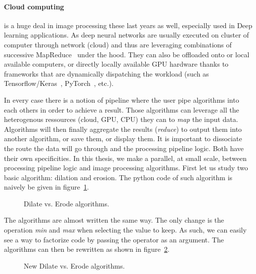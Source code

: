 \paragraph{Cloud computing} is a huge deal in image processing these last years as well, especially used in Deep
learning applications. As deep neural networks are usually executed on cluster of computer through network (cloud) and
thus are leveraging combinations of successive MapReduce~\parencite{dean.2008.mapreduce} under the hood. They can also
be offloaded onto or local available computers, or directly locally available GPU hardware thanks to frameworks that are
dynamically dispatching the workload (such as
Tensorflow/Keras~\parencite{tensorflow.2015.whitepaper,chollet.2015.keras,gulli.2017.deep},
PyTorch~\parencite{paszke.2019.pytorch}, etc.).

In every case there is a notion of pipeline where the user pipe algorithms into each others in order to achieve a
result. Those algorithms can leverage all the heterogenous ressources (cloud, GPU, CPU) they can to \emph{map} the input
data. Algorithms will then finally aggregate the results (\emph{reduce}) to output them into another algorithm, or save
them, or display them. It is important to dissociate the route the data will go through and the processing pipeline
logic. Both have their own specificities. In this thesis, we make a parallel, at small scale, between processing
pipeline logic and image processing algorithms. First let us study two basic algorithm: dilation and erosion. The python
code of such algorithm is naively be given in figure~\ref{code:erode.dilate}.

\begin{figure}[tbh]
  \centering
  \hfil
  \caption{Dilate vs. Erode algorithms.}
  \label{code:erode.dilate}
\end{figure}

The algorithms are almost written the same way. The only change is the operation \emph{min} and \emph{max} when
selecting the value to keep. As such, we can easily see a way to factorize code by passing the operator as an argument.
The algorithms can then be rewritten as shown in figure~\ref{code:erode.dilate.factorized}.

\begin{figure}[tbh]
  \centering
  \vfil
  \smallskip
  \hfil
  \caption{New Dilate vs. Erode algorithms.}
  \label{code:erode.dilate.factorized}
\end{figure}

